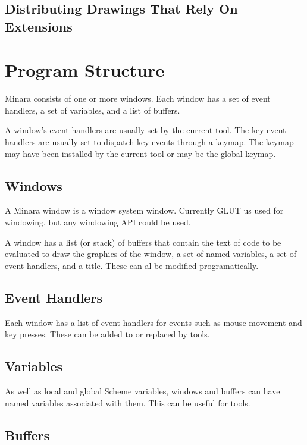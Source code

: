 \subsection{Distributing Drawings That Rely On Extensions}




\section{Program Structure}

Minara consists of one or more windows. Each window has a set of event handlers, a set of variables, and a list of buffers.

A window's event handlers are usually set by the current tool. The key event handlers are usually set to dispatch key events through a keymap. The keymap may have been installed by the current tool or may be the global keymap.

\subsection{Windows}

A Minara window is a window system window. Currently GLUT us used for windowing, but any windowing API could be used.

A window has a list (or stack) of buffers that contain the text of code to be evaluated to draw the graphics of the window, a set of named variables, a set of event handlers, and a title. These can al be modified programatically.

\subsection{Event Handlers}

Each window has a list of event handlers for events such as mouse movement and key presses. These can be added to or replaced by tools.

\subsection{Variables}

As well as local and global Scheme variables, windows and buffers can have named variables associated with them. This can be useful for tools.

\subsection{Buffers}

